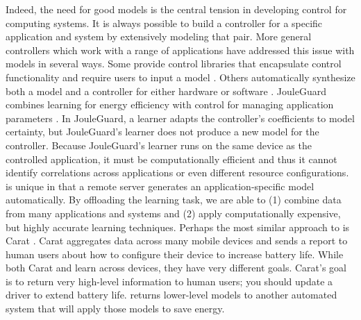 Indeed, the need for good models is the central tension in developing
control for computing systems.  It is always possible to build a
controller for a specific application and system by extensively
modeling that pair.  More general controllers which work with a range
of applications have addressed this issue with models in several ways.
Some provide control libraries that encapsulate control
functionality and require users to input a model
\cite{ControlWare,Sojka,Rajkumar,POET}.  Others
automatically synthesize both a model and a controller for either
hardware \cite{josep-isca2016} or software \cite{ICSE2014,FSE2015}.
JouleGuard combines learning for energy efficiency with control for
managing application parameters \cite{JouleGuard}.  In JouleGuard, a
learner adapts the controller's coefficients to model certainty, but
JouleGuard's learner does not produce a new model for the controller.
Because JouleGuard's learner runs on the same device as the controlled
application, it must be computationally efficient and thus it cannot
identify correlations across applications or even different resource
configurations.  \SYSTEM{} is unique in that a remote server generates
an application-specific model automatically.  By offloading the
learning task, we are able to (1) combine data from many applications
and systems and (2) apply computationally expensive, but highly accurate
learning techniques. Perhaps the most similar approach to \SYSTEM{} is Carat \cite{carat}.
Carat aggregates data across many mobile devices and sends a report to
human users about how to configure their device to increase battery
life.  While both Carat and \SYSTEM{} learn across devices, they have
very different goals.  Carat's goal is to return very high-level
information to human users; \eg{} you should update a driver to extend
battery life.  \SYSTEM{} returns lower-level models to another
automated system that will apply those models to save energy.

